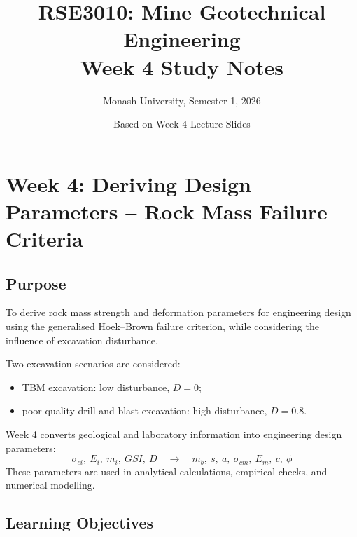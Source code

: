 \documentclass[a4paper,12pt]{article}
\title{\textbf{RSE3010: Mine Geotechnical Engineering}\\Week 4 Study Notes}
\author{Monash University, Semester 1, 2026}
\date{Based on Week 4 Lecture Slides}
\begin{document}
\maketitle

\section{Week 4: Deriving Design Parameters -- Rock Mass Failure Criteria}

\subsection{Purpose}

To derive rock mass strength and deformation parameters for engineering design using the
generalised Hoek--Brown failure criterion, while considering the influence of excavation
disturbance.

Two excavation scenarios are considered:
\begin{itemize}
    \item TBM excavation: low disturbance, \(D=0\);
    \item poor-quality drill-and-blast excavation: high disturbance, \(D=0.8\).
\end{itemize}

\begin{keybox}
Week 4 converts geological and laboratory information into engineering design parameters:
\[
\sigma_{ci},\ E_i,\ m_i,\ GSI,\ D
\quad \rightarrow \quad
m_b,\ s,\ a,\ \sigma_{cm},\ E_m,\ c,\ \phi
\]
These parameters are used in analytical calculations, empirical checks, and numerical
modelling.
\end{keybox}

\subsection{Learning Objectives}
\end{document}
